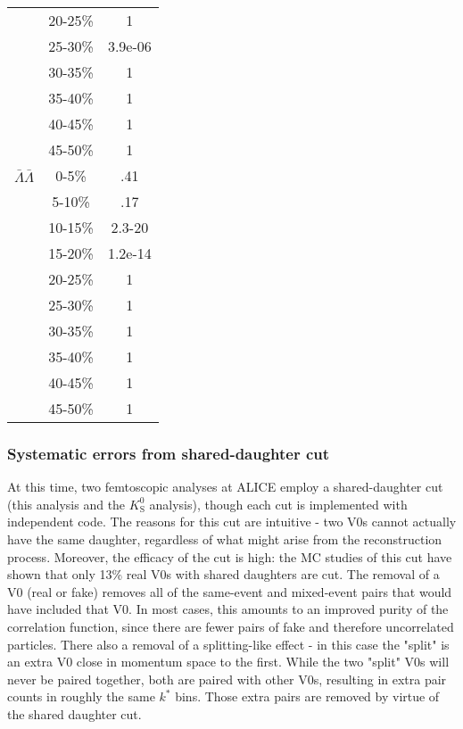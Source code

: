 \begin{table}
\begin{minipage}{18pc}
\begin{center}
\begin{tabular}{| c | c | c |}
   & 20-25\% & 1 \\
   & 25-30\% & 3.9e-06 \\
   & 30-35\% & 1 \\
   & 35-40\% & 1 \\
   & 40-45\% & 1 \\
   & 45-50\% & 1 \\
   \hline
  $\bar{\Lambda}\bar{\Lambda}$ &  0-5\% & .41 \\
   & 5-10\% & .17 \\
   & 10-15\% & 2.3-20 \\
   & 15-20\% & 1.2e-14 \\
   & 20-25\% & 1 \\
   & 25-30\% & 1 \\
   & 30-35\% & 1 \\
   & 35-40\% & 1 \\
   & 40-45\% & 1 \\
   & 45-50\% & 1 \\
   \hline 
\end{tabular}
\end{center}
\end{minipage}
\end{table}

\subsubsection{Systematic errors from shared-daughter cut}

At this time, two femtoscopic analyses at ALICE employ a shared-daughter cut (this analysis and the $K^0_\mathrm{S}$ analysis), though each cut is implemented with independent code.  
The reasons for this cut are intuitive - two V0s cannot actually have the same daughter, regardless of what might arise from the reconstruction process.  
Moreover, the efficacy of the cut is high: the MC studies of this cut have shown that only 13\% real V0s with shared daughters are cut.  
The removal of a V0 (real or fake) removes all of the same-event and mixed-event pairs that would have included that V0.  
In most cases, this amounts to an improved purity of the correlation function, since there are fewer pairs of fake and therefore uncorrelated particles.  
There also a removal of a splitting-like effect - in this case the "split" is an extra V0 close in momentum space to the first.  
While the two "split" V0s will never be paired together, both are paired with other V0s, resulting in extra pair counts in roughly the same $k^*$ bins.  
Those extra pairs are removed by virtue of the shared daughter cut.


